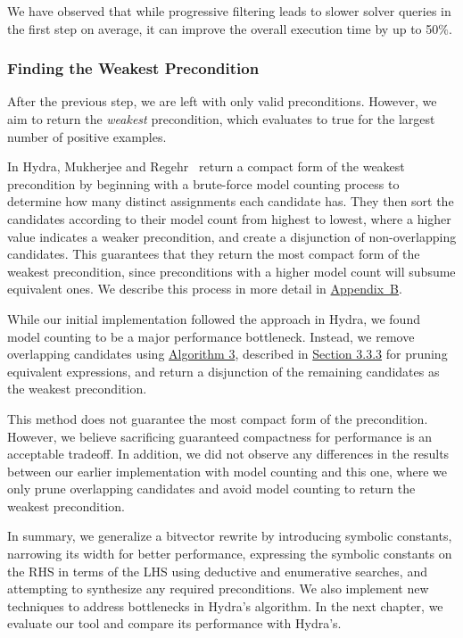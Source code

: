 \documentclass[review, anonymous, acmsmall]{acmart}
\begin{document}
We have observed that while progressive filtering leads to slower solver queries in the first step on average, it can improve the overall execution time by up to 50$\%$.  


\subsubsection{Finding the Weakest Precondition}
After the previous step, we are left with only valid preconditions. However, we aim to return the \textit{weakest} precondition, which evaluates to true for the largest number of positive examples. 

In Hydra, Mukherjee and Regehr\ \cite{mukherjee_hydra_2024} return a compact form of the weakest precondition by beginning with a brute-force model counting process to determine how many distinct assignments each candidate has. They then sort the candidates according to their model count from highest to lowest, where a higher value indicates a weaker precondition, and create a disjunction of non-overlapping candidates. This guarantees that they return the most compact form of the weakest precondition, since preconditions with a higher model count will subsume equivalent ones. We describe this process in more detail in \hyperref[appendix:b]{Appendix~B}.

While our initial implementation followed the approach in Hydra, we found model counting to be a major performance bottleneck. Instead, we remove overlapping candidates using \hyperref[alg:prune]{Algorithm 3}, described in \hyperref[sec:prune]{Section 3.3.3} for pruning equivalent expressions, and return a disjunction of the remaining candidates as the weakest precondition. 

This method does not guarantee the most compact form of the precondition. However, we believe sacrificing guaranteed compactness for performance is an acceptable tradeoff. In addition, we did not observe any differences in the results between our earlier implementation with model counting and this one, where we only prune overlapping candidates and avoid model counting to return the weakest precondition.

In summary, we generalize a bitvector rewrite by introducing symbolic constants, narrowing its width for better performance, expressing the symbolic constants on the RHS in terms of the LHS using deductive and enumerative searches, and attempting to synthesize any required preconditions. We also implement new techniques to address bottlenecks in Hydra's algorithm. In the next chapter, we evaluate our tool and compare its performance with Hydra's. 
\end{document}
